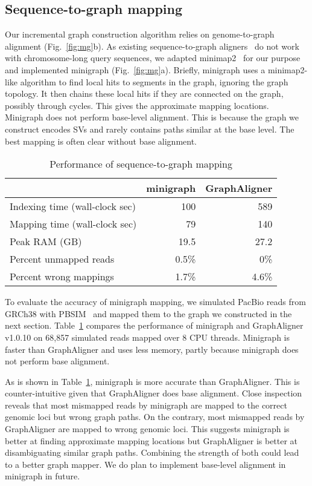 \documentclass[twocolumn]{bmcart}
\begin{document}
\subsection*{Sequence-to-graph mapping}

Our incremental graph construction algorithm relies on genome-to-graph
alignment (Fig.~\ref{fig:mg}b). As existing sequence-to-graph
aligners~\cite{Garrison:2018aa,Rautiainen810812} do not work with
chromosome-long query sequences, we adapted minimap2~\cite{Li:2018ab} for our
purpose and implemented minigraph (Fig.~\ref{fig:mg}a). Briefly, minigraph uses
a minimap2-like algorithm to find local hits to segments in the graph, ignoring
the graph topology. It then chains these local hits if they are connected on
the graph, possibly through cycles. This gives the approximate mapping locations. Minigraph does not
perform base-level alignment. This is because the graph we construct encodes
SVs and rarely contains paths similar at the base level. The best mapping is
often clear without base alignment.

\begin{table}[b]
\caption{Performance of sequence-to-graph mapping}\label{tab:mgvga}
\begin{tabular}{lrr}
\hline
& minigraph & GraphAligner \\
\hline
Indexing time (wall-clock sec) & 100 & 589 \\
Mapping time (wall-clock sec) & 79 & 140 \\
Peak RAM (GB)          & 19.5 & 27.2 \\
Percent unmapped reads & 0.5\% & 0\% \\
Percent wrong mappings & 1.7\% & 4.6\% \\
\hline
\end{tabular}
\end{table}

To evaluate the accuracy of minigraph mapping, we simulated PacBio reads from
GRCh38 with PBSIM~\cite{Ono:2013aa} and mapped them to the graph we constructed
in the next section. Table~\ref{tab:mgvga} compares the performance of
minigraph and GraphAligner~\cite{Rautiainen810812} v1.0.10 on 68,857 simulated
reads mapped over 8 CPU threads. Minigraph is faster than GraphAligner and uses
less memory, partly because minigraph does not perform base alignment.

As is shown in Table~\ref{tab:mgvga}, minigraph is more accurate than
GraphAligner. This is counter-intuitive given that GraphAligner does base
alignment. Close inspection reveals that most mismapped reads by minigraph are
mapped to the correct genomic loci but wrong graph paths. On the contrary, most
mismapped reads by GraphAligner are mapped to wrong genomic loci. This suggests
minigraph is better at finding approximate mapping locations but GraphAligner
is better at disambiguating similar graph paths.  Combining the strength of
both could lead to a better graph mapper. We do plan to implement base-level
alignment in minigraph in future.
\end{document}
